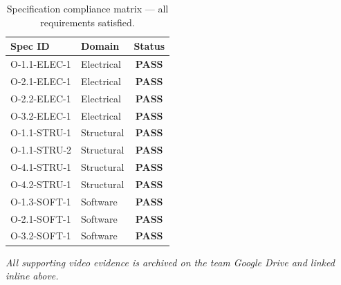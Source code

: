 \documentclass[12pt]{article}
\begin{document}
\begin{table}[H]
\centering
\caption{Specification compliance matrix --- all requirements satisfied.}
\label{tab:specs}
\begin{tabular}{@{}llc@{}}
\toprule
\textbf{Spec ID} & \textbf{Domain} & \textbf{Status} \\
\midrule
O-1.1-ELEC-1 & Electrical & \textcolor{green!50!black}{\textbf{PASS}} \\
O-2.1-ELEC-1 & Electrical & \textcolor{green!50!black}{\textbf{PASS}} \\
O-2.2-ELEC-1 & Electrical & \textcolor{green!50!black}{\textbf{PASS}} \\
O-3.2-ELEC-1 & Electrical & \textcolor{green!50!black}{\textbf{PASS}} \\
\addlinespace
O-1.1-STRU-1 & Structural & \textcolor{green!50!black}{\textbf{PASS}} \\
O-1.1-STRU-2 & Structural & \textcolor{green!50!black}{\textbf{PASS}} \\
O-4.1-STRU-1 & Structural & \textcolor{green!50!black}{\textbf{PASS}} \\
O-4.2-STRU-1 & Structural & \textcolor{green!50!black}{\textbf{PASS}} \\
\addlinespace
O-1.3-SOFT-1 & Software   & \textcolor{green!50!black}{\textbf{PASS}} \\
O-2.1-SOFT-1 & Software   & \textcolor{green!50!black}{\textbf{PASS}} \\
O-3.2-SOFT-1 & Software   & \textcolor{green!50!black}{\textbf{PASS}} \\
\bottomrule
\end{tabular}
\end{table}

\vfill
\begin{center}
\small\textit{All supporting video evidence is archived on the team Google Drive and linked inline above.}
\end{center}
\end{document}
